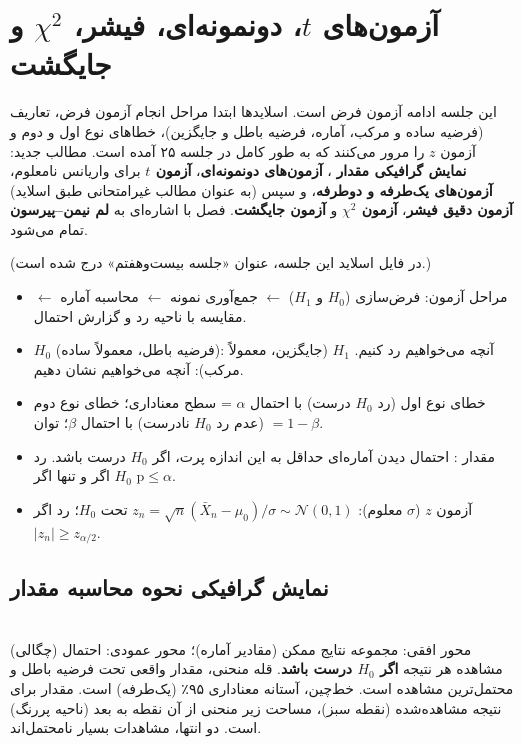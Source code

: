 \chapter{آزمون‌های $t$، دونمونه‌ای، فیشر، $\chi^2$ و جایگشت}

این جلسه ادامه آزمون فرض است. اسلایدها ابتدا مراحل انجام آزمون فرض، تعاریف (فرضیه ساده و مرکب، آماره، فرضیه باطل و جایگزین)، خطاهای نوع اول و دوم و آزمون $z$ را مرور می‌کنند که به طور کامل در جلسه ۲۵ آمده است. مطالب جدید: \textbf{نمایش گرافیکی مقدار }، \textbf{آزمون‌های دونمونه‌ای}، \textbf{آزمون $t$} برای واریانس نامعلوم، \textbf{آزمون‌های یک‌طرفه و دوطرفه}، و سپس (به عنوان مطالب غیرامتحانی طبق اسلاید) \textbf{آزمون دقیق فیشر}، \textbf{آزمون $\chi^2$} و \textbf{آزمون جایگشت}. فصل با اشاره‌ای به \textbf{لم نیمن--پیرسون} تمام می‌شود.

(در فایل اسلاید این جلسه، عنوان «جلسه بیست‌وهفتم» درج شده است.)

\begin{summarybox}
\begin{itemize}
\item مراحل آزمون: فرض‌سازی ($H_0$ و $H_1$) $\leftarrow$ جمع‌آوری نمونه  $\leftarrow$ محاسبه آماره $\leftarrow$ مقایسه با ناحیه رد و گزارش احتمال.
\item $H_0$ (فرضیه باطل، معمولاً ساده): آنچه می‌خواهیم رد کنیم. $H_1$ (جایگزین، معمولاً مرکب): آنچه می‌خواهیم نشان دهیم.
\item خطای نوع اول (رد $H_0$ درست) با احتمال $\alpha$ = سطح معناداری؛ خطای نوع دوم (عدم رد $H_0$ نادرست) با احتمال $\beta$؛ توان $=1-\beta$.
\item مقدار : احتمال دیدن آماره‌ای حداقل به این اندازه پرت، اگر $H_0$ درست باشد. رد $H_0$ اگر و تنها اگر $\text{p}\le\alpha$.
\item آزمون $z$ ($\sigma$ معلوم): $z_n=\sqrt n(\bar X_n-\mu_0)/\sigma\sim\mathcal N(0,1)$ تحت $H_0$؛ رد اگر $|z_n|\ge z_{\alpha/2}$.
\end{itemize}
\end{summarybox}

\section{نمایش گرافیکی نحوه محاسبه مقدار }

\begin{center}
\begin{tikzpicture}
\end{tikzpicture}\\
{\small محور افقی: مجموعه نتایج ممکن (مقادیر آماره)؛ محور عمودی: احتمال (چگالی) مشاهده هر نتیجه \textbf{اگر $H_0$ درست باشد}. قله منحنی، مقدار واقعی تحت فرضیه باطل و محتمل‌ترین مشاهده است. خط‌چین، آستانه معناداری ۹۵٪ (یک‌طرفه) است. مقدار  برای نتیجه مشاهده‌شده (نقطه سبز)، مساحت زیر منحنی از آن نقطه به بعد (ناحیه پررنگ) است. دو انتها، مشاهدات بسیار نامحتمل‌اند.}
\end{center}

